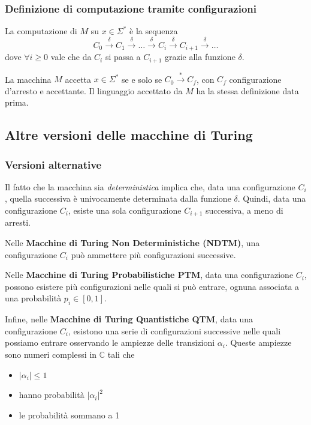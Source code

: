 \subsubsection{Definizione di computazione tramite configurazioni}

La computazione di $M$ su $x \in \Sigma^\ast$ è la sequenza
$$ C_0 \xrightarrow{\delta} C_1 \xrightarrow{\delta} \dots \xrightarrow{\delta} C_i \xrightarrow{\delta} C_{i+1} \xrightarrow{\delta} \dots $$
dove $\forall i \geq 0$ vale che da $C_i$ si passa a $C_{i+1}$ grazie alla funzione $\delta$.

La macchina $M$ accetta $x \in \Sigma^\ast$ se e solo se $C_0 \xrightarrow{\ast}C_f$, con $C_f$ configurazione d'arresto e accettante. Il linguaggio accettato da $M$ ha la stessa definizione data prima.

\subsection{Altre versioni delle macchine di Turing}
\subsubsection{Versioni alternative}

Il fatto che la macchina sia \textit{deterministica} implica che, data una configurazione $C_i$, quella successiva è univocamente determinata dalla funzione $\delta$. Quindi, data una configurazione $C_i$, esiste una sola configurazione $C_{i+1}$ successiva, a meno di arresti. 

Nelle \textbf{Macchine di Turing Non Deterministiche (NDTM)}, una configurazione $C_i$ può ammettere più configurazioni successive.

Nelle \textbf{Macchine di Turing Probabilistiche PTM}, data una configurazione $C_i$, possono esistere più configurazioni nelle quali si può entrare, ognuna associata a una probabilità $p_i \in [0,1]$.

Infine, nelle \textbf{Macchine di Turing Quantistiche QTM}, data una configurazione $C_i$, esistono una serie di configurazioni successive nelle quali possiamo entrare osservando le ampiezze delle transizioni $\alpha_i$. Queste ampiezze sono numeri complessi in $\mathbb{C}$ tali che
\begin{itemize}
	\item $|\alpha_i| \leq 1$
	\item hanno probabilità $|\alpha_i|^2$
	\item le probabilità sommano a 1
\end{itemize}

